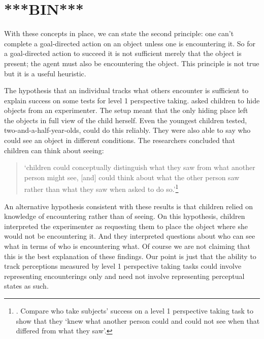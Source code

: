 \documentclass[12pt,\papersize]{extarticle}
\begin{document}
\section{***BIN***}


With these concepts in place, we can state the second principle: one can’t complete a goal-directed action on an object unless one is encountering it.  So for a goal-directed action to succeed it is not sufficient merely that the object is present; the agent must also be encountering the object.  This principle is not true but it is a useful heuristic.

The hypothesis that an individual tracks what others encounter is sufficient to explain success on some tests for level 1 perspective taking.  \citet[]{en_1550} asked children to hide objects from an experimenter.  The setup meant that the only hiding place left the objects in full view of the child herself.  Even the youngest children tested, two-and-a-half-year-olds, could do this reliably.  They were also able to say who could see an object in different conditions.  The researchers concluded that children can think about seeing:
%
\begin{quote}
`children could conceptually distinguish what they saw from what another person might see, [and] could think about what the other person saw rather than what they saw when asked to do so.'\footnote{
\citet[][p.\ 1210]{en_1550}.
Compare \citet[][p.\ 609]{en_1202} who take subjects' success on a level 1 perspective taking task to show that they
`knew what another person could and could not see when that differed from what they saw'.
}
\end{quote}
%
An alternative hypothesis consistent with these results is that children relied on knowledge of encountering rather than of seeing.  On this hypothesis, children interpreted the experimenter as requesting them to place the object where she would not be encountering it.  And they interpreted questions about who can see what in terms of who is encountering what.
Of course we  are not claiming that this is the best explanation of these findings.  
Our point is just that the ability to track perceptions measured by level 1 perspective taking tasks could involve representing encounterings only and need not involve representing perceptual states as such.
























\small

\end{document}
